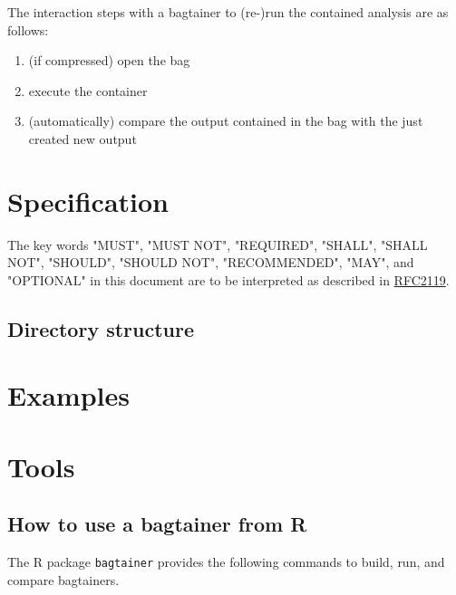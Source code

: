 \documentclass[twoside,a4paper]{refart}
\newcommand{\R}{R}
\begin{document}
The interaction steps with a bagtainer to (re-)run the contained analysis are as follows:

\begin{enumerate}
    \item (if compressed) open the bag
    \item execute the container
    \item (automatically) compare the output contained in the bag with the just created new output
\end{enumerate}


\section{Specification}

The key words "MUST", "MUST NOT", "REQUIRED", "SHALL", "SHALL NOT", "SHOULD", "SHOULD NOT", "RECOMMENDED", "MAY", and "OPTIONAL" in this document are to be interpreted as described in \href{http://tools.ietf.org/html/rfc2119}{RFC2119}.

\subsection{Directory structure}



\section{Examples}




\section{Tools}

\subsection{How to use a bagtainer from \R{}}

The  R package \texttt{bagtainer} provides the following commands to build, run, and compare bagtainers.
\end{document}
